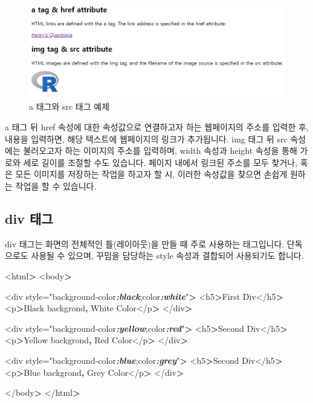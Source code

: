 \documentclass[12pt,]{book}
\newenvironment{Shaded}{\begin{snugshade}}{\end{snugshade}}
\newcommand{\InformationTok}[1]{\textcolor[rgb]{0.56,0.35,0.01}{\textbf{\textit{#1}}}}
\newcommand{\NormalTok}[1]{#1}
\newcommand{\OperatorTok}[1]{\textcolor[rgb]{0.81,0.36,0.00}{\textbf{#1}}}
\begin{document}
\begin{figure}[h]

{\centering \includegraphics[width=0.7\linewidth]{images/html_6} 

}

\caption{a 태그와 src 태그 예제}\label{fig:unnamed-chunk-16}
\end{figure}

a 태그 뒤 href 속성에 대한 속성값으로 연결하고자 하는 웹페이지의 주소를 입력한 후, 내용을 입력하면, 해당 텍스트에 웹페이지의 링크가 추가됩니다. img 태그 뒤 src 속성에는 불러오고자 하는 이미지의 주소를 입력하며, width 속성과 height 속성을 통해 가로와 세로 길이를 조절할 수도 있습니다. 페이지 내에서 링크된 주소를 모두 찾거나, 혹은 모든 이미지를 저장하는 작업을 하고자 할 시, 이러한 속성값을 찾으면 손쉽게 원하는 작업을 할 수 있습니다.

\hypertarget{div-}{%
\subsection{div 태그}\label{div-}}

div 태그는 화면의 전체적인 틀(레이아웃)을 만들 때 주로 사용하는 태그입니다. 단독으로도 사용될 수 있으며, 꾸밈을 담당하는 style 속성과 결합되어 사용되기도 합니다.

\begin{Shaded}
\begin{Highlighting}[]
\NormalTok{<html}\OperatorTok{>}
\NormalTok{<body}\OperatorTok{>}

\NormalTok{<div style="background-color}\InformationTok{:black}\NormalTok{;color}\InformationTok{:white}\NormalTok{"}\OperatorTok{>}
\NormalTok{  <h5}\OperatorTok{>}\NormalTok{First Div</h5}\OperatorTok{>}
\NormalTok{  <p}\OperatorTok{>}\NormalTok{Black backgrond}\OperatorTok{,}\NormalTok{ White Color</p}\OperatorTok{>}
\NormalTok{</div}\OperatorTok{>} 

\NormalTok{<div style="background-color}\InformationTok{:yellow}\NormalTok{;color}\InformationTok{:red}\NormalTok{"}\OperatorTok{>}
\NormalTok{  <h5}\OperatorTok{>}\NormalTok{Second Div</h5}\OperatorTok{>}
\NormalTok{  <p}\OperatorTok{>}\NormalTok{Yellow backgrond}\OperatorTok{,}\NormalTok{ Red Color</p}\OperatorTok{>}
\NormalTok{</div}\OperatorTok{>} 

\NormalTok{<div style="background-color}\InformationTok{:blue}\NormalTok{;color}\InformationTok{:grey}\NormalTok{"}\OperatorTok{>}
\NormalTok{  <h5}\OperatorTok{>}\NormalTok{Second Div</h5}\OperatorTok{>}
\NormalTok{  <p}\OperatorTok{>}\NormalTok{Blue backgrond}\OperatorTok{,}\NormalTok{ Grey Color</p}\OperatorTok{>}
\NormalTok{</div}\OperatorTok{>} 

\NormalTok{</body}\OperatorTok{>}
\NormalTok{</html}\OperatorTok{>}
\end{Highlighting}
\end{Shaded}
\end{document}
